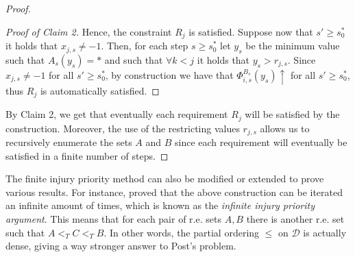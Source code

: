 \documentclass[12pt,a4paper]{article}
\theoremstyle{definition}
\begin{document}
\begin{proof}
\begin{proof}[Proof of Claim 2]
        Hence, the constraint $R_j$ is satisfied. Suppose now that $s' \geq s_0^*$ it holds that $x_{j,s} \neq -1$. Then, for each step $s \geq s_0^*$ let $y_s$ be the minimum value such that $A_s(y_s) = *$ and such that $\forall k < j$ it holds that $y_s > r_{j,s}$. Since $x_{j,s} \neq -1$ for all $s' \geq s_0^*$, by construction we have that $\Phi_{i,s}^{B_s}(y_s) \uparrow$ for all $s' \geq s_0^*$, thus $R_j$ is automatically satisfied. 
    \end{proof}

    By Claim 2, we get that eventually each requirement $R_j$ will be satisfied by the construction. Moreover, the use of the restricting values $r_{j,s}$ allows us to recursively enumerate the sets $A$ and $B$ since each requirement will eventually be satisfied in a finite number of steps.

    \end{proof}

    The finite injury priority method can also be modified or extended to prove various results. For instance, \textcite{sacks} proved that the above construction can be iterated an infinite amount of times, which is known as the \textit{infinite injury priority argument}. This means that for each pair of r.e. sets $A,B$ there is another r.e. set such that $A <_T C <_T B$. In other words, the partial ordering $\leq$ on $\mathcal{D}$ is actually dense, giving a way stronger answer to Post's problem.

    \newpage
    \printbibliography
\end{document}
